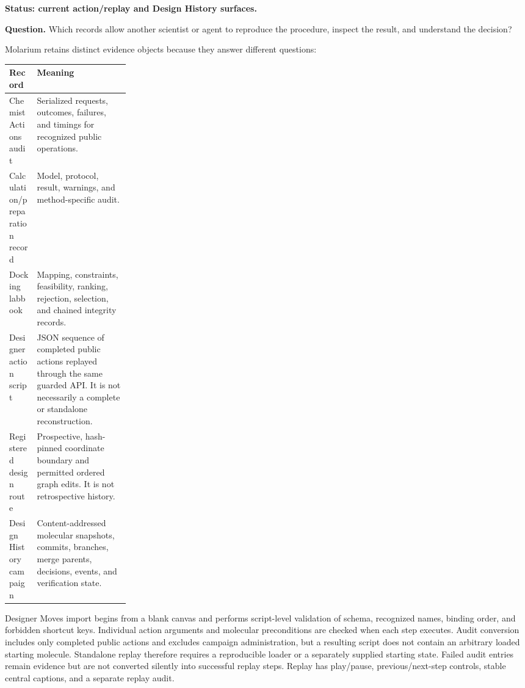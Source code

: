 \begin{small}
\textbf{Status: current action/replay and Design History surfaces.}

\textbf{Question.} Which records allow another scientist or agent to reproduce the procedure, inspect the result, and understand the decision?

Molarium retains distinct evidence objects because they answer different questions:

\begin{center}
\begin{tabularx}{\linewidth}{@{}p{0.23\linewidth}X@{}}
\toprule
\textbf{Record} & \textbf{Meaning}\\
\midrule
Chemist Actions audit & Serialized requests, outcomes, failures, and timings for recognized public operations.\\
Calculation/preparation record & Model, protocol, result, warnings, and method-specific audit.\\
Docking labbook & Mapping, constraints, feasibility, ranking, rejection, selection, and chained integrity records.\\
Designer action script & JSON sequence of completed public actions replayed through the same guarded API. It is not necessarily a complete or standalone reconstruction.\\
Registered design route & Prospective, hash-pinned coordinate boundary and permitted ordered graph edits. It is not retrospective history.\\
Design History campaign & Content-addressed molecular snapshots, commits, branches, merge parents, decisions, events, and verification state.\\
\bottomrule
\end{tabularx}
\end{center}

Designer Moves import begins from a blank canvas and performs script-level validation of schema, recognized names, binding order, and forbidden shortcut keys. Individual action arguments and molecular preconditions are checked when each step executes. Audit conversion includes only completed public actions and excludes campaign administration, but a resulting script does not contain an arbitrary loaded starting molecule. Standalone replay therefore requires a reproducible loader or a separately supplied starting state. Failed audit entries remain evidence but are not converted silently into successful replay steps. Replay has play/pause, previous/next-step controls, stable central captions, and a separate replay audit.


\end{small}
